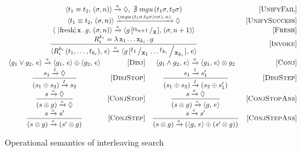 \begin{figure*}[h]
  \renewcommand{\arraystretch}{1.6}
  \[
  \begin{array}{crcr}
    \multicolumn{3}{c}{\taskst{t_1 \equiv t_2}{(\sigma, n)} \xrightarrow{\circ} \Diamond , \, \, \nexists\; mgu\,(t_1 \sigma, t_2 \sigma)} &\ruleno{UnifyFail} \\
    \multicolumn{3}{c}{\taskst{t_1 \equiv t_2}{(\sigma, n)} \xrightarrow{(mgu\,(t_1 \sigma, t_2 \sigma) \circ \sigma),\, n)} \Diamond} & \ruleno{UnifySuccess} \\
    \multicolumn{3}{c}{\taskst{\mbox{\lstinline|fresh|}\, \ttt{x}\, .\, g}{(\sigma, n)} \xrightarrow{\circ} \taskst{g\,[\bigslant{\alpha_{n + 1}}{\ttt{x}}]}{( \sigma, n + 1)}} & \ruleno{Fresh} \\
    \multicolumn{3}{c}{\dfrac{R_i^{k_i}=\lambda\,\ttt{x}_1\dots \ttt{x}_{k_i}\,.\,g}{\taskst{R_i^{k_i}\,(t_1,\dots,t_{k_i})}{e} \xrightarrow{\circ} \taskst{g\,[\bigslant{t_1}{\ttt{x}_1}\dots\bigslant{t_{k_i}}{\ttt{x}_{k_i}}]}{e}}} & \ruleno{Invoke}\\[3mm]
    \taskst{g_1 \lor g_2}{e} \xrightarrow{\circ} \taskst{g_1}{e} \oplus \taskst{g_2}{e} & \ruleno{Disj} &
    \taskst{g_1 \land g_2}{e} \xrightarrow{\circ} \taskst{g_1}{e} \otimes g_2 & \ruleno{Conj} \\    
    \dfrac{s_1 \xrightarrow{l} \Diamond}{(s_1 \oplus s_2) \xrightarrow{l} s_2} & \ruleno{DisjStop} &
    \dfrac{s_1 \xrightarrow{l} s'_1}{(s_1 \oplus s_2) \xrightarrow{l} (s_2 \oplus s'_1)} &\ruleno{DisjStep} \\
    \dfrac{s \xrightarrow{\circ} \Diamond}{(s \otimes g) \xrightarrow{\circ} \Diamond} &\ruleno{ConjStop} &
    \dfrac{s \xrightarrow{e} \Diamond}{(s \otimes g) \xrightarrow{\circ} \taskst{g}{e}}  & \ruleno{ConjStopAns}\\
    \dfrac{s \xrightarrow{\circ} s'}{(s \otimes g) \xrightarrow{\circ} (s' \otimes g)} &\ruleno{ConjStep} &
    \dfrac{s \xrightarrow{e} s'}{(s \otimes g) \xrightarrow{\circ} (\taskst{g}{e} \oplus (s' \otimes g))} & \ruleno{ConjStepAns} 
  \end{array}
  \]
  \caption{Operational semantics of interleaving search}
  \label{fig:operanional_semantics_rules}
\end{figure*}


